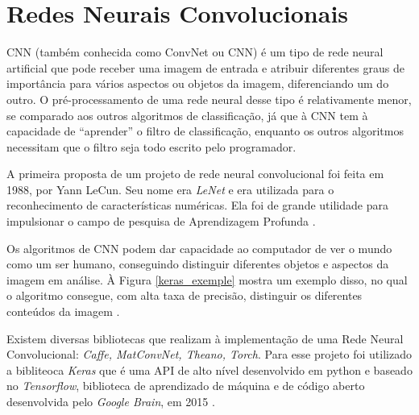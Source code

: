 \section{Redes Neurais Convolucionais}
\label{redes neurais convolucionais}

\acrlong{CNN} (também conhecida como ConvNet ou CNN) é um tipo de rede neural artificial que pode receber uma imagem de entrada e atribuir diferentes graus de importância para vários aspectos ou objetos da imagem, diferenciando um do outro. O pré-processamento de uma rede neural desse tipo é relativamente menor, se comparado aos outros algoritmos de classificação, já que à CNN tem à capacidade de “aprender” o filtro de classificação, enquanto os outros algoritmos necessitam que o filtro seja todo escrito pelo programador\cite{redesneuraisconv,deeplearningbook}.

A primeira proposta de um projeto de rede neural convolucional foi feita em 1988, por Yann LeCun. Seu nome era \textit{LeNet} e era utilizada para o reconhecimento de características numéricas. Ela foi de grande utilidade para impulsionar o campo de pesquisa de Aprendizagem Profunda \cite{redesneuraisconv}.

Os algoritmos de CNN podem dar capacidade ao computador de ver o mundo como um ser humano, conseguindo distinguir diferentes objetos e aspectos da imagem em análise. À Figura  \ref{keras_exemple} mostra um exemplo disso, no qual  o algoritmo consegue, com alta taxa de precisão, distinguir os diferentes conteúdos da imagem \cite{conv1,conv2}.

\begin{figure}[H]
	\centering
\end{figure}

Existem diversas bibliotecas que realizam à implementação de uma Rede Neural Convolucional: \textit{Caffe, MatConvNet, Theano, Torch}. Para esse projeto foi utilizado a bibliteoca \textit{Keras} que é uma API de alto nível desenvolvido em python e baseado no \textit{Tensorflow}, biblioteca de aprendizado de máquina  e de código aberto desenvolvida pelo \textit{Google Brain}, em 2015 \cite{redesneuraisconv,keras,tensorflow}.

